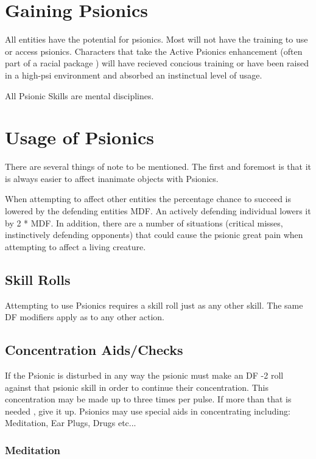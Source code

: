 \documentclass{book}
\begin{document}
\section{Gaining Psionics}

All entities have the potential for psionics. Most will not have the
training to use or access psionics. Characters that take the Active
Psionics enhancement (often part of a racial package ) will have
recieved concious training or have been raised in a high-psi environment
and absorbed an instinctual level of usage.

All Psionic Skills are mental disciplines.

\section{Usage of Psionics}

There are several things of note to be mentioned. The first and foremost
is that it is always easier to affect inanimate objects with Psionics.

When attempting to affect other entities the percentage chance to succeed
is lowered by the defending entities MDF. An actively defending individual
lowers it by 2 * MDF. In addition, there are a number of situations
(critical misses, instinctively defending opponents) that could cause
the psionic great pain when attempting to affect a living creature.

\subsection{Skill Rolls}

Attempting to use Psionics requires a skill roll just as any other skill.
The same DF modifiers apply as to any other action. 

\subsection{Concentration Aids/Checks}

If the Psionic is disturbed in any way the psionic must make an DF -2 roll
against that psionic skill in order to continue their concentration. This
concentration may be made up to three times per pulse. If more than that is
needed , give it up. Psionics may use special aids in concentrating including: 
Meditation, Ear Plugs, Drugs etc...

\subsubsection{Meditation}
\end{document}
